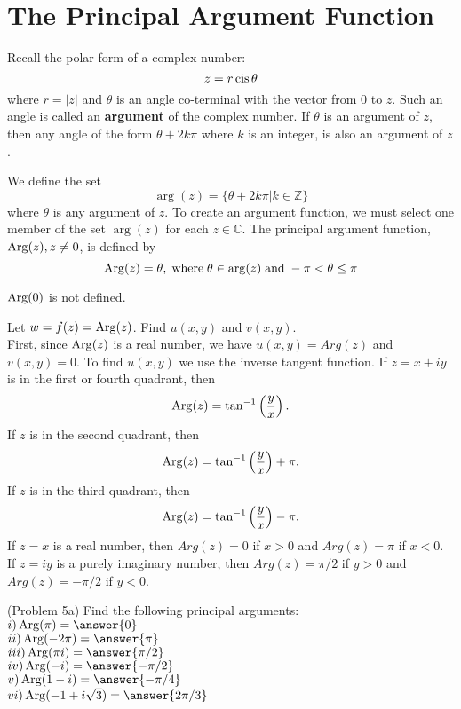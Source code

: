 \documentclass[handout]{ximera}
\begin{document}
\section{The Principal Argument Function}

Recall the polar form of a complex number:
\[
z = r\operatorname{cis}\theta
\]
where $r = |z|$ and $\theta$ is an angle co-terminal with the vector from $0$ to $z$. Such an angle is called an {\bf argument}
of the complex number. If $\theta$ is an argument of $z$, then any angle of the form $\theta +2k\pi$ where $k$ is an integer, is also an argument of $z$.

We define the set
\[
\arg(z) = \{\theta + 2k\pi | k \in \mathbb{Z}\}
\]
where $\theta$ is any argument of $z$.
To create an argument function, we must select one member of the set $\arg(z)$ for each $z \in \mathbb{C}$.
The principal argument function, $\operatorname{Arg}(z), z \neq 0$, is defined by
\[
\operatorname{Arg}(z) = \theta, \;\mbox{where}\; \theta\in\arg(z)\;\mbox{and}\; -\pi < \theta \leq \pi
\]

\begin{remark}
$\operatorname{Arg}(0)$ is not defined.
\end{remark}

\begin{example}[Example 5] 
Let $w = f(z) = \operatorname{Arg}(z)$. Find $u(x,y)$ and $v(x,y)$.\\ 
First, since $\operatorname{Arg}(z)$ is a real number, we have $u(x,y) = Arg(z)$ and $v(x,y) = 0$.
To find $u(x,y)$ we use the inverse tangent function.
If $z=x+iy$ is in the first or fourth quadrant, then 
\[
\operatorname{Arg}(z) = \tan^{-1}\left(\frac{y}{x}\right).
\]
If $z$ is in the second quadrant, then 
\[
\operatorname{Arg}(z) = \tan^{-1}\left(\frac{y}{x}\right) + \pi.
\]
If $z$ is in the third quadrant, then 
\[
\operatorname{Arg}(z) = \tan^{-1}\left(\frac{y}{x}\right) - \pi.
\]
If $z =x$ is a real number, then $Arg(z) = 0$ if $x>0$ and  $Arg(z) = \pi$ if $x<0$.\\
If $z = iy$ is a purely imaginary number, then $Arg(z) = \pi/2$ if $y>0$ and $Arg(z) = -\pi/2$ if $y<0$.
\end{example}


\begin{problem}(Problem 5a)
Find the following principal arguments:\\
$i) \Arg(\pi) = \answer{0}$\\
$ii) \Arg(-2\pi) = \answer{\pi}$\\
$iii) \Arg(\pi i) = \answer{\pi/2}$\\
$iv) \Arg(-i) = \answer{-\pi/2}$\\
$v) \Arg(1-i) = \answer{-\pi/4}$\\
$vi) \Arg(-1+i\sqrt 3) = \answer{2\pi/3}$
\end{problem}
\end{document}
